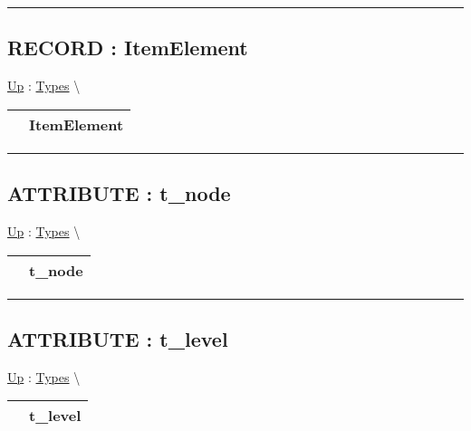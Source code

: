 \par


\rule{\linewidth}{0.5pt}
\subsection*{RECORD : ItemElement}
\hypertarget{ecldoc:ml_core.types.itemelement}{}
\hyperlink{ecldoc:ML_Core.Types}{Up} :
\hspace{0pt} \hyperlink{ecldoc:ML_Core.Types}{Types} \textbackslash 

{\renewcommand{\arraystretch}{1.5}
\begin{tabularx}{\textwidth}{|>{\raggedright\arraybackslash}l|X|}
\hline
\hspace{0pt} & ItemElement \\
\hline
\end{tabularx}
}

\par


\rule{\linewidth}{0.5pt}
\subsection*{ATTRIBUTE : t\_node}
\hypertarget{ecldoc:ml_core.types.t_node}{}
\hyperlink{ecldoc:ML_Core.Types}{Up} :
\hspace{0pt} \hyperlink{ecldoc:ML_Core.Types}{Types} \textbackslash 

{\renewcommand{\arraystretch}{1.5}
\begin{tabularx}{\textwidth}{|>{\raggedright\arraybackslash}l|X|}
\hline
\hspace{0pt} & t\_node \\
\hline
\end{tabularx}
}

\par


\rule{\linewidth}{0.5pt}
\subsection*{ATTRIBUTE : t\_level}
\hypertarget{ecldoc:ml_core.types.t_level}{}
\hyperlink{ecldoc:ML_Core.Types}{Up} :
\hspace{0pt} \hyperlink{ecldoc:ML_Core.Types}{Types} \textbackslash 

{\renewcommand{\arraystretch}{1.5}
\begin{tabularx}{\textwidth}{|>{\raggedright\arraybackslash}l|X|}
\hline
\hspace{0pt} & t\_level \\
\hline
\end{tabularx}
}

